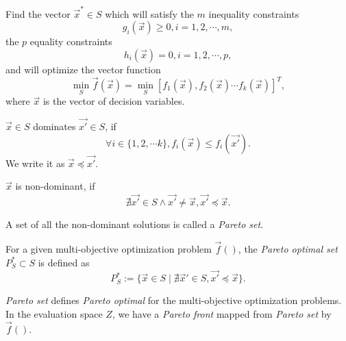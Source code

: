 \documentclass[12pt]{article}
\begin{document}
\begin{mydef}
\label{def:multi_opt}
Find the vector $ \vec{x}^{*} \in S $ which will satisfy the $ m $ inequality constraints
\begin{equation}
\label{eq:mo_ineq_constraint}
g_{i}(\vec{x}) \geq 0, i = 1, 2, \cdots , m, 
\end{equation}
the $ p $ equality constraints
\begin{equation}
\label{eq:mo_eq_constraint}
h_{i}(\vec{x}) = 0, i = 1, 2, \cdots , p, 
\end{equation}
and will optimize the vector function
\begin{equation}
\label{eq:mo_obj}
\min_{ S } \vec{f}(\vec{x}) = \min_{ S } \left[ f_{1}(\vec{x}), f_{2}(\vec{x}) \cdots f_{k}(\vec{x}) \right]^{T},
\end{equation}
where $ \vec{x} $ is the vector of decision variables.
\end{mydef}

\begin{mydef}
\label{def:dominance}
$ \vec{x} \in S $ dominates $ \vec{x'} \in S $, if 
\begin{equation}
\label{eq:def_dominance}
\forall i \in \{ 1, 2, \cdots k \}, f_{i}(\vec{x}) \leq f_{i}(\vec{x'}).
\end{equation}
We write it as $ \vec{x} \preceq \vec{x'} $.

$ \vec{x}  $ is non-dominant, if 
\begin{equation}
\label{eq:def_nondominant}
\nexists \vec{x'} \in S \land \vec{x'} \neq \vec{x}, \vec{x'} \preceq \vec{x}.
\end{equation}
\end{mydef}

A set of all the non-dominant solutions is called a \emph{Pareto set}.
\begin{mydef}
\label{def:pareto_opt_set}
For a given multi-objective optimization problem $ \vec{f}() $, the \emph{Pareto optimal set} $ P^{*}_{S} \subset S $ is defined as
\begin{equation}
\label{eq:pa_opt_set}
P^{*}_{S} := \{ \vec{x} \in S \mid \nexists \vec{x}' \in S, \vec{x'} \preceq  \vec{x} \}.
\end{equation}

\end{mydef}

\emph{Pareto set} defines \emph{Pareto optimal} for the multi-objective optimization problems.
In the evaluation space $ Z $, we have a \emph{Pareto front} mapped from \emph{Pareto set} by $ \vec{f}() $.
\end{document}
